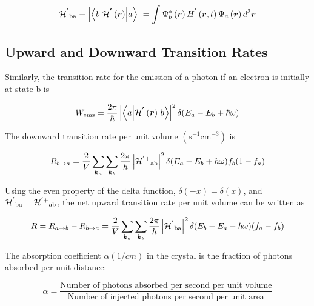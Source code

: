 \begin{equation}
{\mathcal{H}^{'}}_{\text{ba}} \equiv \left| \left\langle b \middle| \mathcal{H}^{\bm{'}}\left( \bm{r} \right) \middle| a \right\rangle \right| = \int_{}^{}{\Psi_{b}^{*}\left( \bm{r} \right)H^{'}\left( \bm{r},t \right)\Psi_{a}\left( \bm{r} \right)d^{3}\bm{r}}
\end{equation}

\subsection{Upward and Downward Transition Rates} \label{UpDownTR}

Similarly, the transition rate for the emission of a photon if an
electron is initially at state b is

\begin{equation}
W_{\text{ems}} = \frac{2\pi}{\hbar}\left| \left\langle a \middle| \mathcal{H}^{\bm{'}}\left( \bm{r} \right) \middle| b \right\rangle \right|^{2}\delta(E_{a} - E_{b} + \hbar\omega)
\end{equation}

The downward transition rate per unit volume
\((s^{- 1}\text{cm}^{- 3})\) is

\begin{equation}
R_{b \rightarrow a} = \frac{2}{V}\sum_{\bm{k}_{a}}^{}{\sum_{\bm{k}_{b}}^{}\frac{2\pi}{\hbar}}\left| {\mathcal{H}^{' +}}_{\text{ab}} \right|^{2}\delta(E_{a} - E_{b} + \hbar\omega)f_{b}(1 - f_{a})
\end{equation}

Using the even property of the delta function,
\(\delta\left( - x \right) = \delta\left( x \right)\), and
\({\mathcal{H}^{'}}_{\text{ba}} = {\mathcal{H}^{' +}}_{\text{ab}}\), the net upward
transition rate per unit volume can be written as

\begin{equation}
R = R_{a \rightarrow b} - R_{b \rightarrow a} = \frac{2}{V}\sum_{\bm{k}_{a}}^{}{\sum_{\bm{k}_{b}}^{}\frac{2\pi}{\hbar}}\left| {\mathcal{H}^{'}}_{\text{ba}} \right|^{2}\delta(E_{b} - E_{a} - \hbar\omega)(f_{a} - f_{b})
\end{equation}

The absorption coefficient \(\alpha(1/cm)\) in the crystal is the
fraction of photons absorbed per unit distance:

\begin{equation}
\alpha = \frac{\text{Number\ of\ photons\ absorbed\ per\ second\ per\ unit\ volume}}{\text{Number\ of\ injected\ photons\ per\ second\ per\ unit\ area}}
\end{equation}

